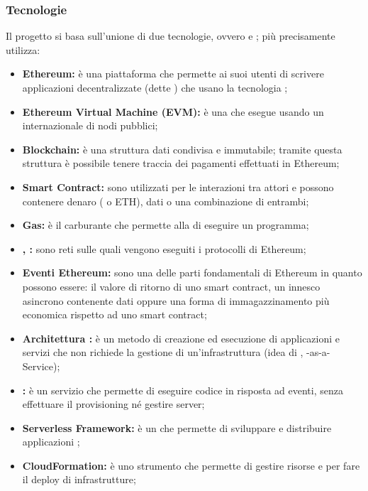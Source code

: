     \subsubsection{Tecnologie}
     Il progetto si basa sull'unione di due tecnologie, ovvero  e ; più precisamente utilizza:
    		 \begin{itemize}
    			\item \textbf{Ethereum: }è una piattaforma che permette ai suoi utenti di scrivere applicazioni decentralizzate (dette ) che usano la tecnologia ;
    			\item \textbf{Ethereum Virtual Machine (EVM): }è una  che esegue  usando un  internazionale di nodi pubblici;
    			\item \textbf{Blockchain: }è una struttura dati condivisa e immutabile; tramite questa struttura è possibile tenere traccia dei pagamenti effettuati in Ethereum;
    			\item \textbf{Smart Contract: }sono utilizzati per le interazioni tra attori e possono contenere denaro ( o ETH), dati o una combinazione di entrambi;
    			\item \textbf{Gas: }è il carburante che permette alla  di eseguire un programma;
    		 	\item \textbf{, : }sono reti sulle quali vengono eseguiti i protocolli di Ethereum;
    		 	\item \textbf{Eventi Ethereum: }sono una delle parti fondamentali di Ethereum in quanto possono essere: il  valore di ritorno di uno smart contract, un innesco asincrono contenente dati oppure una forma di  immagazzinamento più economica rispetto ad uno smart contract;
    			 \item \textbf{Architettura : }è un metodo di creazione ed esecuzione di applicazioni e servizi che non richiede la gestione di un'infrastruttura (idea di , -as-a-Service);
    		 	\item \textbf{: }è un servizio che permette di eseguire codice  in risposta ad eventi, senza effettuare il provisioning né gestire server;
    		 	\item \textbf{Serverless Framework: }è un   che permette di sviluppare e distribuire applicazioni ;
    		 	\item \textbf{CloudFormation: }è uno strumento che permette di gestire risorse e per fare il deploy di infrastrutture;

\end{itemize}
